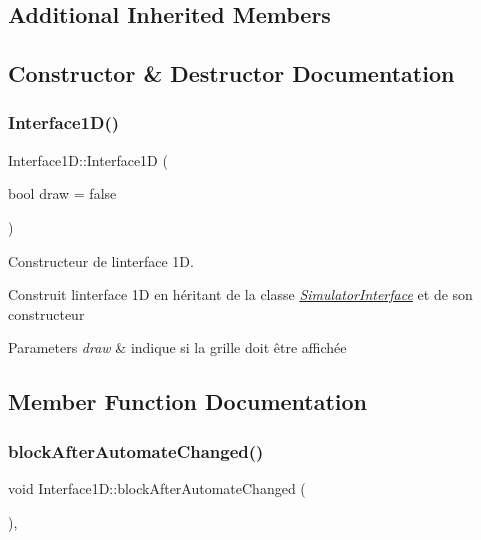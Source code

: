 \subsection*{Additional Inherited Members}


\subsection{Constructor \& Destructor Documentation}
\mbox{\label{class_interface1_d_a896f89a887e9b880679ded91a5782ac1}} 
\subsubsection{\texorpdfstring{Interface1\+D()}{Interface1D()}}
{\footnotesize\ttfamily Interface1\+D\+::\+Interface1D (\begin{DoxyParamCaption}\item[{bool}]{draw = {\ttfamily false} }\end{DoxyParamCaption})}



Constructeur de l\textquotesingle{}interface 1D. 

Construit l\textquotesingle{}interface 1D en héritant de la classe {\itshape \mbox{\hyperlink{class_simulator_interface}{Simulator\+Interface}}} et de son constructeur 
\begin{DoxyParams}{Parameters}
{\em draw} & indique si la grille doit être affichée \\
\hline
\end{DoxyParams}


\subsection{Member Function Documentation}
\mbox{\label{class_interface1_d_a24cf627d76f7e315b78ae79570cbbbef}} 
\subsubsection{\texorpdfstring{block\+After\+Automate\+Changed()}{blockAfterAutomateChanged()}}
{\footnotesize\ttfamily void Interface1\+D\+::block\+After\+Automate\+Changed (\begin{DoxyParamCaption}{ }\end{DoxyParamCaption})\hspace{0.3cm}{\ttfamily [protected]}, {\ttfamily [virtual]}}



